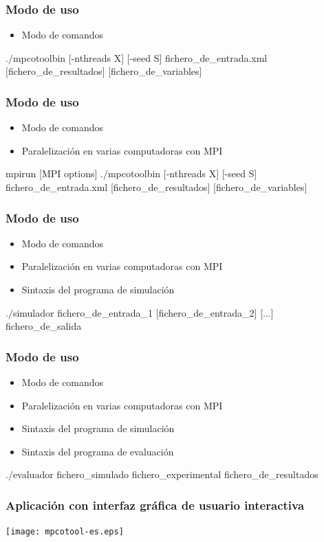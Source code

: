 \documentclass{beamer}
\begin{document}
\begin{frame}
	\frametitle{Modo de uso}
	\begin{itemize}
		\item Modo de comandos
	\end{itemize}
.$/$mpcotoolbin [-nthreads X] [-seed S] fichero\_de\_entrada.xml
[fichero\_de\_resultados] [fichero\_de\_variables]
\end{frame}

\begin{frame}
	\frametitle{Modo de uso}
	\begin{itemize}
		\item Modo de comandos
		\item Paralelización en varias computadoras con MPI
	\end{itemize}
mpirun [MPI options] .$/$mpcotoolbin [-nthreads X] [-seed S] fichero\_de\_entrada.xml
[fichero\_de\_resultados] [fichero\_de\_variables]
\end{frame}

\begin{frame}
	\frametitle{Modo de uso}
	\begin{itemize}
		\item Modo de comandos
		\item Paralelización en varias computadoras con MPI
		\item Sintaxis del programa de simulación
	\end{itemize}
.$/$simulador fichero\_de\_entrada\_1 [fichero\_de\_entrada\_2] [...]
fichero\_de\_salida
\end{frame}

\begin{frame}
	\frametitle{Modo de uso}
	\begin{itemize}
		\item Modo de comandos
		\item Paralelización en varias computadoras con MPI
		\item Sintaxis del programa de simulación
		\item Sintaxis del programa de evaluación
	\end{itemize}
.$/$evaluador fichero\_simulado fichero\_experimental fichero\_de\_resultados
\end{frame}

\begin{frame}
	\frametitle{Aplicación con interfaz gráfica de usuario interactiva}
	\texttt{[image: mpcotool-es.eps]}
\end{frame}
\end{document}
